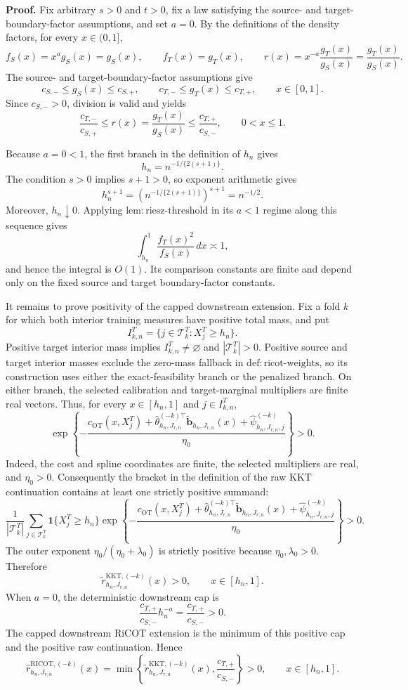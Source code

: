 \textbf{Proof.}
Fix arbitrary \(s>0\) and \(t>0\), fix a law satisfying the source- and target-boundary-factor assumptions, and set \(a=0\). By the definitions of the density factors, for every \(x\in(0,1]\),
\[
f_S(x)=x^a g_S(x)=g_S(x),
\qquad
f_T(x)=g_T(x),
\qquad
r(x)=x^{-a}\frac{g_T(x)}{g_S(x)}=\frac{g_T(x)}{g_S(x)}.
\]
The source- and target-boundary-factor assumptions give
\[
c_{S,-}\le g_S(x)\le c_{S,+},
\qquad
c_{T,-}\le g_T(x)\le c_{T,+},
\qquad x\in[0,1].
\]
Since \(c_{S,-}>0\), division is valid and yields
\[
\frac{c_{T,-}}{c_{S,+}}
\le r(x)=\frac{g_T(x)}{g_S(x)}
\le \frac{c_{T,+}}{c_{S,-}},
\qquad 0<x\le1.
\]

Because \(a=0<1\), the first branch in the definition of \(h_n\) gives
\[
h_n=n^{-1/\{2(s+1)\}}.
\]
The condition \(s>0\) implies \(s+1>0\), so exponent arithmetic gives
\[
h_n^{s+1}
=\left(n^{-1/\{2(s+1)\}}\right)^{s+1}
=n^{-1/2}.
\]
Moreover, \(h_n\downarrow0\). Applying \(\mathrm{lem{:}riesz\text{-}threshold}\) in its \(a<1\) regime along this sequence gives
\[
\int_{h_n}^1\frac{f_T(x)^2}{f_S(x)}\,dx\asymp1,
\]
and hence the integral is \(O(1)\). Its comparison constants are finite and depend only on the fixed source and target boundary-factor constants.

It remains to prove positivity of the capped downstream extension. Fix a fold \(k\) for which both interior training measures have positive total mass, and put
\[
I^T_{k,n}=\{j\in\mathcal T^T_k:X_j^T\ge h_n\}.
\]
Positive target interior mass implies \(I^T_{k,n}\ne\varnothing\) and \(|\mathcal T^T_k|>0\). Positive source and target interior masses exclude the zero-mass fallback in \(\mathrm{def{:}ricot\text{-}weights}\), so its construction uses either the exact-feasibility branch or the penalized branch. On either branch, the selected calibration and target-marginal multipliers are finite real vectors. Thus, for every \(x\in[h_n,1]\) and \(j\in I^T_{k,n}\),
\[
\exp\!\left\{-\frac{c_{\mathrm{OT}}(x,X_j^T)
+\widehat\theta_{h_n,J_{r,n}}^{(-k)\top}
\widetilde{\mathbf b}_{h_n,J_{r,n}}(x)
+\widehat\psi^{(-k)}_{h_n,J_{r,n},j}}{\eta_0}\right\}>0.
\]
Indeed, the cost and spline coordinates are finite, the selected multipliers are real, and \(\eta_0>0\). Consequently the bracket in the definition of the raw KKT continuation contains at least one strictly positive summand:
\[
\frac{1}{|\mathcal T^T_k|}
\sum_{j\in\mathcal T^T_k}\mathbf 1\{X_j^T\ge h_n\}
\exp\!\left\{-\frac{c_{\mathrm{OT}}(x,X_j^T)
+\widehat\theta_{h_n,J_{r,n}}^{(-k)\top}
\widetilde{\mathbf b}_{h_n,J_{r,n}}(x)
+\widehat\psi^{(-k)}_{h_n,J_{r,n},j}}{\eta_0}\right\}>0.
\]
The outer exponent \(\eta_0/(\eta_0+\lambda_0)\) is strictly positive because \(\eta_0,\lambda_0>0\). Therefore
\[
\widetilde r^{\mathrm{KKT},(-k)}_{h_n,J_{r,n}}(x)>0,
\qquad x\in[h_n,1].
\]
When \(a=0\), the deterministic downstream cap is
\[
\frac{c_{T,+}}{c_{S,-}}h_n^{-a}=\frac{c_{T,+}}{c_{S,-}}>0.
\]
The capped downstream RiCOT extension is the minimum of this positive cap and the positive raw continuation. Hence
\[
\widehat r^{\mathrm{RICOT},(-k)}_{h_n,J_{r,n}}(x)
=\min\!\left\{
\widetilde r^{\mathrm{KKT},(-k)}_{h_n,J_{r,n}}(x),
\frac{c_{T,+}}{c_{S,-}}
\right\}>0,
\qquad x\in[h_n,1].
\]


